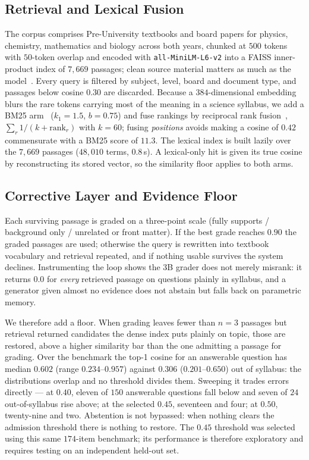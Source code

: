 \documentclass[conference]{IEEEtran}
\begin{document}
\subsection{Retrieval and Lexical Fusion}
The corpus comprises Pre-University textbooks and board papers for physics,
chemistry, mathematics and biology across both years, chunked at $500$ tokens
with $50$-token overlap and encoded with \texttt{all-MiniLM-L6-v2} into a FAISS
inner-product index of $7{,}669$ passages; clean source material matters as much
as the model~\cite{roh2021}. Every query is filtered by subject, level, board
and document type, and passages below cosine $0.30$ are discarded. Because a
$384$-dimensional embedding blurs the rare tokens carrying most of the meaning
in a science syllabus, we add a BM25 arm~\cite{robertson2009} ($k_1=1.5$,
$b=0.75$) and fuse rankings by reciprocal rank fusion~\cite{cormack2009},
$\sum_r 1/(k + \text{rank}_r)$ with $k=60$; fusing \emph{positions} avoids
making a cosine of $0.42$ commensurate with a BM25 score of $11.3$. The lexical
index is built lazily over the $7{,}669$ passages ($48{,}010$ terms, $0.8$\,s).
A lexical-only hit is given its true cosine by reconstructing its stored vector,
so the similarity floor applies to both arms.

\subsection{Corrective Layer and Evidence Floor}
\label{sec:floor}
Each surviving passage is graded on a three-point scale (fully supports /
background only / unrelated or front matter). If the best grade reaches $0.90$
the graded passages are used; otherwise the query is rewritten into textbook
vocabulary and retrieval repeated, and if nothing usable survives the system
declines. Instrumenting the loop shows the $3$B grader does not merely misrank:
it returns $0.0$ for \emph{every} retrieved passage on questions plainly in
syllabus, and a generator given almost no evidence does not abstain but falls
back on parametric memory.

We therefore add a floor. When grading leaves fewer than $n=3$ passages but
retrieval returned candidates the dense index puts plainly on topic, those are
restored, above a higher similarity bar than the one admitting a passage for
grading. Over the benchmark the top-1 cosine for an answerable question has
median $0.602$ (range $0.234$--$0.957$) against $0.306$ ($0.201$--$0.650$) out
of syllabus: the distributions overlap and no threshold divides them. Sweeping
it trades errors directly --- at $0.40$, eleven of $150$ answerable questions
fall below and seven of $24$ out-of-syllabus rise above; at the selected $0.45$,
seventeen and four; at $0.50$, twenty-nine and two. Abstention is not bypassed:
when nothing clears the admission threshold there is nothing to restore. The
$0.45$ threshold was selected using this same $174$-item benchmark; its
performance is therefore exploratory and requires testing on an independent
held-out set.
\end{document}
